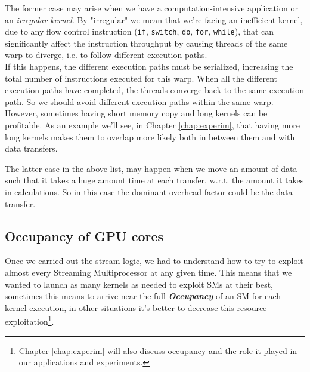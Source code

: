 	The former case may arise when we have a computation-intensive application or an \textit{irregular kernel}.
	By "irregular" we mean that we're facing an inefficient kernel, due to any flow control instruction (\texttt{if}, \texttt{switch}, \texttt{do}, \texttt{for}, \texttt{while}), that can significantly affect the instruction throughput by causing threads of the same warp to diverge, i.e. to follow different execution paths.\\ 
	If this happens, the different execution paths must be serialized, increasing the total number of instructions executed for this warp. When all the different execution paths have completed, the threads converge back to the same execution path\cite{cudaguide}.	
	So we should avoid different execution paths within the same warp.\\
	However, sometimes having short memory copy and long kernels can be profitable. As an example we'll see, in Chapter \ref{chap:experim}, that having more long kernels makes them to overlap more likely both in between them and with data transfers.
	
	
	The latter case in the above list, may happen when we move an amount of data such that it takes a huge amount time at each transfer, w.r.t. the amount it takes in calculations. So in this case the dominant overhead factor could be the data transfer.	

	
	\subsection{Occupancy of GPU cores}
	Once we carried out the stream logic, we had to understand how to try to exploit almost every Streaming Multiprocessor at any given time.
	This means that we wanted to launch as many kernels as needed to exploit SMs at their best, sometimes this means to arrive near the full \textit{\textbf{Occupancy}} of an SM for each kernel execution, in other situations it's better to decrease this resource exploitation\footnote{Chapter \ref{chap:experim} will also discuss occupancy and the role it played in our applications and experiments.}.
	
